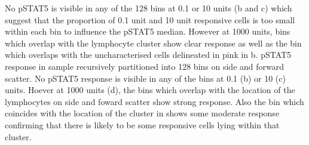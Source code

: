 No pSTAT5 is visible in any of the 128 bins at 0.1 or 10 units (b and c) which suggest that the proportion of
0.1 unit and 10 unit responsive cells is too small within each bin to influence the pSTAT5 median.
However at 1000 units, bins which overlap with the lymphocyte cluster show clear response as well as the bin which overlaps with the uncharacterised cells
delineated in pink in b.
{pSTAT5 response in sample recursively partitioned into 128 bins on side and forward scatter.}
{
  No pSTAT5 response is visible in any of the bins at 0.1 (b) or 10 (c) units.
  Hoever at 1000 units (d), the bins which overlap with the location of the lymphocytes on side and foward scatter show strong response.
  Also the bin which coincides with the location of the cluster in  shows some moderate response
  confirming that there is likely to be some responsive cells lying within that cluster.
}


